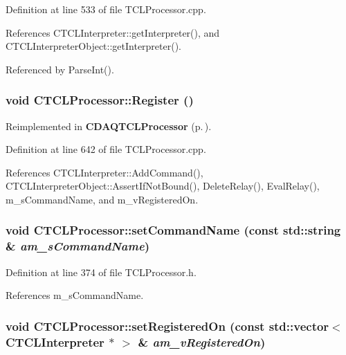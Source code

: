Definition at line 533 of file TCLProcessor.cpp.

References CTCLInterpreter::get\-Interpreter(), and CTCLInterpreter\-Object::get\-Interpreter().

Referenced by Parse\-Int().
\subsubsection{\setlength{\rightskip}{0pt plus 5cm}void CTCLProcessor::Register ()\hspace{0.3cm}{\tt  [virtual]}}\label{classCTCLProcessor_a15}




Reimplemented in {\bf CDAQTCLProcessor} {\rm (p.\,\pageref{classCDAQTCLProcessor_a4})}.

Definition at line 642 of file TCLProcessor.cpp.

References CTCLInterpreter::Add\-Command(), CTCLInterpreter\-Object::Assert\-If\-Not\-Bound(), Delete\-Relay(), Eval\-Relay(), m\_\-s\-Command\-Name, and m\_\-v\-Registered\-On.
\subsubsection{\setlength{\rightskip}{0pt plus 5cm}void CTCLProcessor::set\-Command\-Name (const std::string \& {\em am\_\-s\-Command\-Name})\hspace{0.3cm}{\tt  [inline, protected]}}\label{classCTCLProcessor_b0}




Definition at line 374 of file TCLProcessor.h.

References m\_\-s\-Command\-Name.
\subsubsection{\setlength{\rightskip}{0pt plus 5cm}void CTCLProcessor::set\-Registered\-On (const std::vector$<$ {\bf CTCLInterpreter} $\ast$ $>$ \& {\em am\_\-v\-Registered\-On})\hspace{0.3cm}{\tt  [inline, protected]}}\label{classCTCLProcessor_b1}




